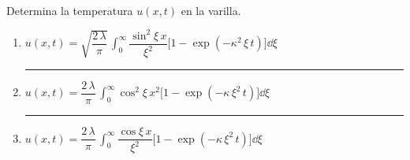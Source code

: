 \begin{enumerate}
\begin{align*}
\end{align*}
Determina la temperatura $u(x, t)$ en la varilla.
\begin{enumerate}[label=3.\alph*)]
\setlength\itemsep{2em}
\item $u(x, t) = \sqrt{\dfrac{2 \, \lambda}{\pi}} \, \displaystyle \int_{0}^{\infty} \dfrac{\sin^{2} \xi \, x}{\xi^{2}} \big[ 1 - \exp(-\kappa^{2} \, \xi \, t)\big] \dd{\xi}$ \hrule
\item $u(x, t) = \dfrac{2 \, \lambda}{\pi} \, \displaystyle \int_{0}^{\infty} \cos^{2} \xi \, x^{2} \big[ 1 - \exp(-\kappa \, \xi^{2} \, t)\big] \dd{\xi}$ \hrule
\item $u(x, t) = \dfrac{2 \, \lambda}{\pi} \, \displaystyle \int_{0}^{\infty} \dfrac{\cos \xi \, x}{\xi^{2}} \big[ 1 - \exp(-\kappa \, \xi^{2} \, t)\big] \dd{\xi}$
\end{enumerate}    
\end{enumerate}

